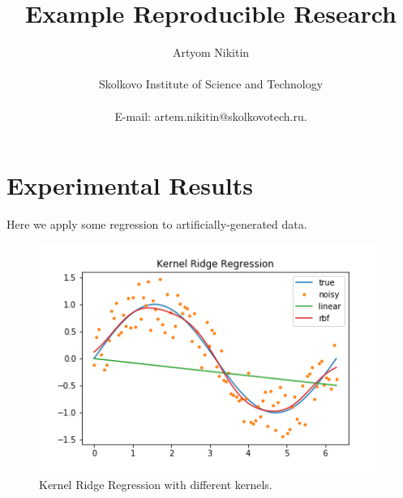 \documentclass[12pt]{article}
\title{Example Reproducible Research}
\author
{Artyom Nikitin\\
\\
\normalsize{Skolkovo Institute of Science and Technology}\\
\\
\normalsize{E-mail:  artem.nikitin@skolkovotech.ru.}
}
\date{}
\begin{document}
 

\maketitle 

\newpage

\section{Experimental Results}

Here we apply some regression to artificially-generated data.

\begin{figure}[ht]
    \centering
    \includegraphics[width=\textwidth]{figs/plot}
    \caption{Kernel Ridge Regression with different kernels.}
\end{figure}
\end{document}
